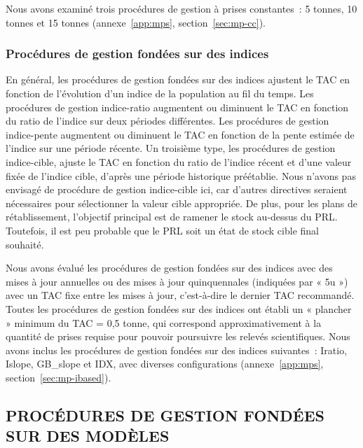 \documentclass[11pt]{book}
\begin{document}
Nous avons examiné trois procédures de gestion à prises constantes~: 5 tonnes, 10 tonnes et 15 tonnes (annexe~\ref{app:mps}, section~\ref{sec:mp-cc}).

\hypertarget{procuxe9dures-de-gestion-fonduxe9es-sur-des-indices}{%
\subsubsection{Procédures de gestion fondées sur des indices}\label{procuxe9dures-de-gestion-fonduxe9es-sur-des-indices}}

En général, les procédures de gestion fondées sur des indices ajustent le TAC en fonction de l'évolution d'un indice de la population au fil du temps. Les procédures de gestion indice-ratio augmentent ou diminuent le TAC en fonction du ratio de l'indice sur deux périodes différentes. Les procédures de gestion indice-pente augmentent ou diminuent le TAC en fonction de la pente estimée de l'indice sur une période récente. Un troisième type, les procédures de gestion indice-cible, ajuste le TAC en fonction du ratio de l'indice récent et d'une valeur fixée de l'indice cible, d'après une période historique préétablie. Nous n'avons pas envisagé de procédure de gestion indice-cible ici, car d'autres directives seraient nécessaires pour sélectionner la valeur cible appropriée. De plus, pour les plans de rétablissement, l'objectif principal est de ramener le stock au-dessus du PRL. Toutefois, il est peu probable que le PRL soit un état de stock cible final souhaité.

Nous avons évalué les procédures de gestion fondées sur des indices avec des mises à jour annuelles ou des mises à jour quinquennales (indiquées par « 5u ») avec un TAC fixe entre les mises à jour, c'est-à-dire le dernier TAC recommandé. Toutes les procédures de gestion fondées sur des indices ont établi un « plancher » minimum du TAC = 0,5 tonne, qui correspond approximativement à la quantité de prises requise pour pouvoir poursuivre les relevés scientifiques. Nous avons inclus les procédures de gestion fondées sur des indices suivantes~: Iratio, Islope, GB\_slope et IDX, avec diverses configurations (annexe~\ref{app:mps}, section~\ref{sec:mp-ibased}).

\hypertarget{procuxe9dures-de-gestion-fonduxe9es-sur-des-moduxe8les}{%
\subsection{PROCÉDURES DE GESTION FONDÉES SUR DES MODÈLES}\label{procuxe9dures-de-gestion-fonduxe9es-sur-des-moduxe8les}}
\end{document}
